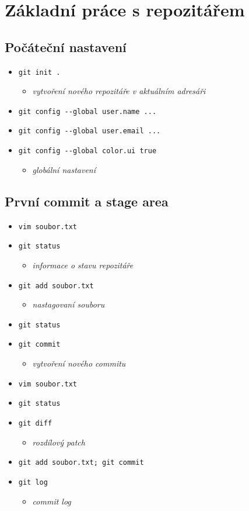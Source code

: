 \documentclass[10pt,twocolumn]{article}
\begin{document}
\section{Základní práce s repozitářem}
\subsection{Počáteční nastavení}

\begin{itemize}
  \item \texttt{git init .}
  \begin{itemize} \item \textit{vytvoření nového repozitáře v aktuálním adresáři} \end{itemize}
  \item \texttt{git config {-}{-}global user.name ...}
  \item \texttt{git config {-}{-}global user.email ...}
  \item \texttt{git config {-}{-}global color.ui true }
  \begin{itemize} \item \textit{globální nastavení} \end{itemize}
\end{itemize}

\subsection{První commit a stage area}

\begin{itemize}
  \item \texttt{vim soubor.txt}
  \item \texttt{git status}
  \begin{itemize} \item \textit{informace o stavu repozitáře} \end{itemize}
  \item \texttt{git add soubor.txt}
  \begin{itemize} \item \textit{nastagovaní souboru} \end{itemize}
  \item \texttt{git status}
  \item \texttt{git commit}
  \begin{itemize} \item \textit{vytvoření nového commitu} \end{itemize}
  \item \texttt{vim soubor.txt}
  \item \texttt{git status}
  \item \texttt{git diff}
  \begin{itemize} \item \textit{rozdílový patch} \end{itemize}
  \item \texttt{git add soubor.txt; git commit}
  \item \texttt{git log}
  \begin{itemize} \item \textit{commit log} \end{itemize}
\end{itemize}
\end{document}
